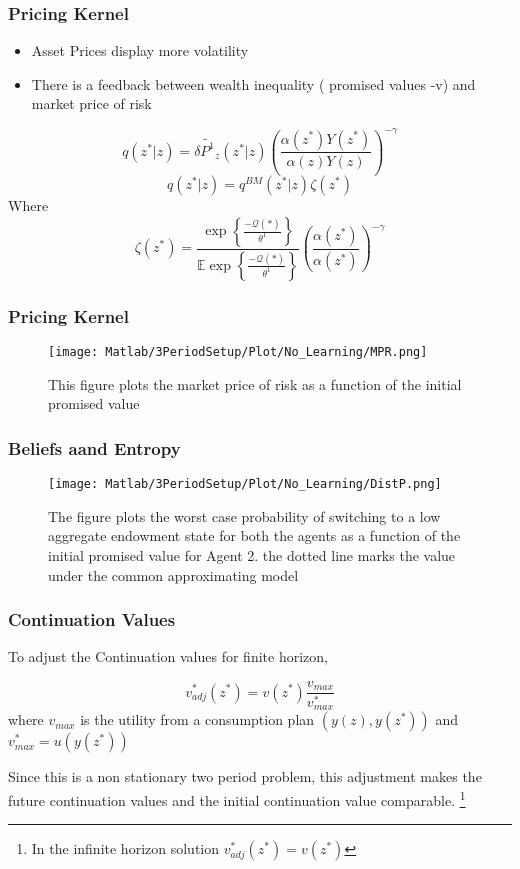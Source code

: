 \documentclass{beamer}
\theoremstyle{Definition}
\begin{document}
\begin{frame}
\frametitle{Pricing Kernel}
\begin{itemize}
\item Asset Prices display more volatility
\item There is a feedback between wealth inequality ( promised values
  -v) and market price of risk
\end{itemize}

\[q(z^* | z)=\delta \tilde{P^1}_z(z^* |z)\left(\frac{\alpha(z^*)Y(z^*)}{\alpha(z)Y(z)}\right)^{-\gamma}\]
\[q(z^* | z)=q^{BM}(z^* | z)\zeta(z^*)\]
Where 
\[\zeta(z^*) = \frac{\exp\left\{\frac{-\mathcal{Q}(*)}{\theta^1}\right\}}{\mathbb{E}\exp\left\{\frac{-\mathcal{Q}(*)}{\theta^1}\right\}}\left(\frac{\alpha(z^*)}{\alpha(z^*)}\right)^{-\gamma} \]

\end{frame}

\begin{frame}
\frametitle{Pricing Kernel}
\begin{figure}[htbp]
\centering
	  \texttt{[image: Matlab/3PeriodSetup/Plot/No\_Learning/MPR.png]}

	\caption{This figure plots the market price of risk as a function of the initial promised value}
	\label{fig:MPR}
\end{figure} 

\end{frame}
\begin{frame}
\frametitle{Beliefs aand Entropy}
\begin{figure}[htbp]
\centering
	  \texttt{[image: Matlab/3PeriodSetup/Plot/No\_Learning/DistP.png]}

	\caption{The figure plots the worst case probability of switching to a low aggregate endowment state for both the agents as a function of the initial promised value for Agent 2. the dotted line marks the value under the common approximating model }
	\label{fig:DistP}
\end{figure} 

\end{frame}

\begin{frame}
\frametitle{Continuation Values}

To adjust the Continuation values for finite horizon,

\[v^*_{adj}(z^*)=v(z^*)\frac{v_{max}}{v^*_{max}}\]
where 
$v_{max}$ is the utility from a consumption plan $(y(z),y(z^*))$ and $v^*_{max} = u(y(z^*))$

Since this is a non stationary two period problem, this adjustment makes the future continuation values and the initial continuation value comparable. \footnote{In the infinite horizon solution $v^*_{adj}(z^*)=v(z^*)$}

\end{frame}
\end{document}
